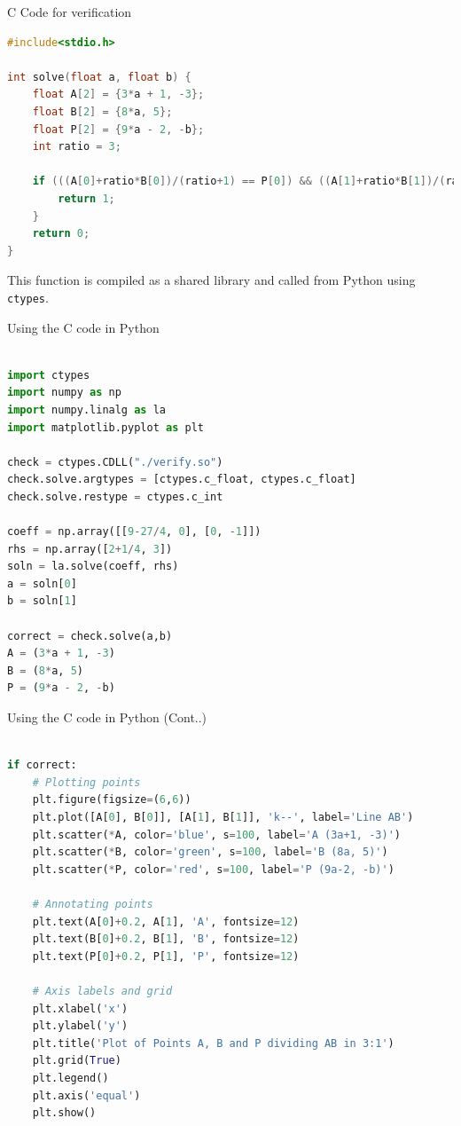 \documentclass{beamer}
\begin{document}
\begin{frame}[fragile]{C Code for verification}
\begin{lstlisting}[language=C, basicstyle=\ttfamily\scriptsize]
#include<stdio.h>

int solve(float a, float b) {
    float A[2] = {3*a + 1, -3};
    float B[2] = {8*a, 5};
    float P[2] = {9*a - 2, -b};
    int ratio = 3;

    if (((A[0]+ratio*B[0])/(ratio+1) == P[0]) && ((A[1]+ratio*B[1])/(ratio+1) == P[1])) {
        return 1;
    }
    return 0;
}
\end{lstlisting}

This function is compiled as a shared library
and called from Python using \texttt{ctypes}.
\end{frame}

\begin{frame}[fragile]{Using the C code in Python}
\begin{lstlisting}[language=Python, basicstyle=\ttfamily\scriptsize]

import ctypes
import numpy as np
import numpy.linalg as la
import matplotlib.pyplot as plt

check = ctypes.CDLL("./verify.so")
check.solve.argtypes = [ctypes.c_float, ctypes.c_float]
check.solve.restype = ctypes.c_int

coeff = np.array([[9-27/4, 0], [0, -1]])
rhs = np.array([2+1/4, 3])
soln = la.solve(coeff, rhs)
a = soln[0]
b = soln[1]

correct = check.solve(a,b)
A = (3*a + 1, -3)
B = (8*a, 5)
P = (9*a - 2, -b)

\end{lstlisting}
\end{frame}

\begin{frame}[fragile]{Using the C code in Python (Cont..)}
\begin{lstlisting}[language=Python, basicstyle=\ttfamily\scriptsize]

if correct:
    # Plotting points
    plt.figure(figsize=(6,6))
    plt.plot([A[0], B[0]], [A[1], B[1]], 'k--', label='Line AB')  
    plt.scatter(*A, color='blue', s=100, label='A (3a+1, -3)')
    plt.scatter(*B, color='green', s=100, label='B (8a, 5)')
    plt.scatter(*P, color='red', s=100, label='P (9a-2, -b)')

    # Annotating points
    plt.text(A[0]+0.2, A[1], 'A', fontsize=12)
    plt.text(B[0]+0.2, B[1], 'B', fontsize=12)
    plt.text(P[0]+0.2, P[1], 'P', fontsize=12)

    # Axis labels and grid
    plt.xlabel('x')
    plt.ylabel('y')
    plt.title('Plot of Points A, B and P dividing AB in 3:1')
    plt.grid(True)
    plt.legend()
    plt.axis('equal')
    plt.show()
    
\end{lstlisting}
\end{frame}
\end{document}
